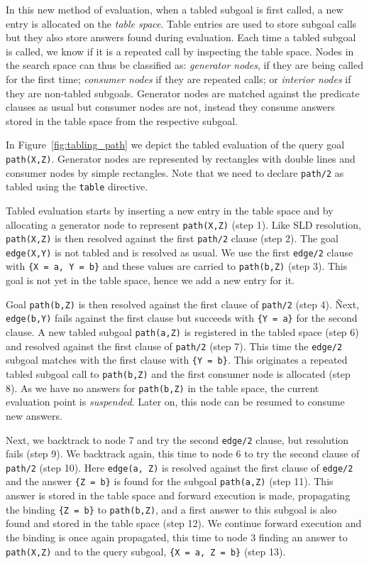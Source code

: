 In this new method of evaluation, when a tabled subgoal is first called, a new entry is allocated on the \textit{table space}. Table
entries are used to store subgoal calls but they also store answers found during evaluation. Each time a tabled subgoal is called, we
know if it is a repeated call by inspecting the table space. Nodes in the search space can thus be classified as:
\textit{generator nodes}, if they are being called for the first time; \textit{consumer nodes} if they are repeated calls;
or \textit{interior nodes} if they are non-tabled subgoals. Generator nodes are matched against the predicate clauses as usual but
consumer nodes are not, instead they consume answers stored in the table space from the respective subgoal.

In Figure~\ref{fig:tabling_path} we depict the tabled evaluation of the query goal \texttt{path(X,Z)}.
Generator nodes are represented by rectangles with double lines and consumer nodes by simple rectangles.
Note that we need to declare \texttt{path/2} as tabled using the \texttt{table} directive.

Tabled evaluation starts by inserting a new entry in the table space and by allocating a generator
node to represent \texttt{path(X,Z)} (step 1). Like SLD resolution, \texttt{path(X,Z)} is then resolved
against the first \texttt{path/2} clause (step 2). The goal \texttt{edge(X,Y)} is not tabled and is
resolved as usual. We use the first \texttt{edge/2} clause with \texttt{\{X~=~a,~Y~=~b\}} and these values
are carried to \texttt{path(b,Z)} (step 3). This goal is not yet in the table space, hence we add a new entry for it.

Goal \texttt{path(b,Z)} is then resolved against the first clause of \texttt{path/2} (step 4).
Ñext, \texttt{edge(b,Y)} fails against the first clause but succeeds with \texttt{\{Y~=~a\}} for
the second clause. A new tabled subgoal \texttt{path(a,Z)} is registered in the tabled space (step 6)
and resolved against the first clause of \texttt{path/2} (step 7). This time the \texttt{edge/2}
subgoal matches with the first clause with \texttt{\{Y~=~b\}}. This originates a repeated tabled subgoal
call to \texttt{path(b,Z)} and the first consumer node is allocated (step 8). As we have no answers for \texttt{path(b,Z)}
in the table space, the current evaluation point is \textit{suspended}. Later on, this node can be resumed to
consume new answers.

Next, we backtrack to node 7 and try the second \texttt{edge/2} clause, but resolution fails (step 9). We backtrack again, this time to
node 6 to try the second clause of \texttt{path/2} (step 10). Here \texttt{edge(a, Z)} is resolved against the
first clause of \texttt{edge/2} and the answer \texttt{\{Z~=~b\}} is found for the subgoal \texttt{path(a,Z)} (step 11).
This answer is stored in the table space and forward execution is made, propagating the binding \texttt{\{Z~=~b\}} to
\texttt{path(b,Z)}, and a first answer to this subgoal is also found and stored in the table space (step 12).
We continue forward execution and the binding is once again propagated, this time to node 3 finding an answer to
\texttt{path(X,Z)} and to the query subgoal, \texttt{\{X~=~a,~Z~=~b\}} (step 13).


